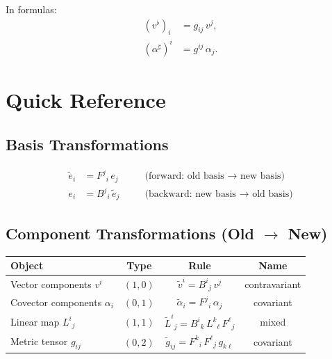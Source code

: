 \documentclass[12pt, a4paper]{report}
\theoremstyle{definition}
\theoremstyle{plain}
\theoremstyle{remark}
\newcommand{\tildee}[1]{\tilde{e}_{#1}}
\begin{document}
In formulas:
\begin{align}
    (v^{\flat})_i &= g_{ij}\, v^{j}, \\
    (\alpha^{\sharp})^{i} &= g^{ij}\, \alpha_j.
\end{align}

\appendix
\chapter{Quick Reference}\label{app:summary}

\section{Basis Transformations}

\begin{align}
    \tildee{i} &= F^{j}{}_{i}\, e_j
        &\quad& \text{(forward: old basis $\to$ new basis)} \\
    e_i &= B^{j}{}_{i}\, \tildee{j}
        &\quad& \text{(backward: new basis $\to$ old basis)}
\end{align}

\section{Component Transformations (Old $\to$ New)}

\begin{center}
\renewcommand{\arraystretch}{1.4}
\begin{tabular}{lccc}
    \toprule
    \textbf{Object} & \textbf{Type} & \textbf{Rule} & \textbf{Name} \\
    \midrule
    Vector components $v^{i}$    & $(1,0)$ & $\tilde{v}^{i} = B^{i}{}_{j}\,v^{j}$
        & contravariant \\
    Covector components $\alpha_i$ & $(0,1)$ & $\tilde{\alpha}_i = F^{j}{}_{i}\,\alpha_j$
        & covariant \\
    Linear map $L^{i}{}_{j}$     & $(1,1)$ & $\tilde{L}^{i}{}_{j} = B^{i}{}_{k}\,L^{k}{}_{\ell}\,F^{\ell}{}_{j}$
        & mixed \\
    Metric tensor $g_{ij}$       & $(0,2)$ & $\tilde{g}_{ij} = F^{k}{}_{i}\,F^{\ell}{}_{j}\,g_{k\ell}$
        & covariant \\
    \bottomrule
\end{tabular}
\end{center}
\end{document}
